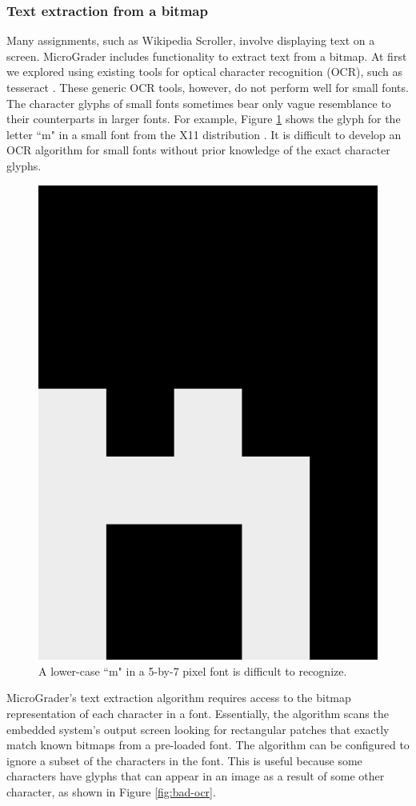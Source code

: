\documentclass[12pt]{article}
\begin{document}
\subsubsection{Text extraction from a bitmap}
Many assignments, such as Wikipedia Scroller, involve displaying text on a screen.  MicroGrader includes functionality to extract text from a bitmap.  At first we explored using existing tools for optical character recognition (OCR), such as tesseract \cite{tesseract}.  These generic OCR tools, however, do not perform well for small fonts.  The character glyphs of small fonts sometimes bear only vague resemblance to their counterparts in larger fonts.  For example, Figure \ref{fig:small-glyph} shows the glyph for the letter ``m" in a small font from the X11 distribution \cite{5x7}.  It is difficult to develop an OCR algorithm for small fonts without prior knowledge of the exact character glyphs.


\begin{figure}[ht]
\centering
\includegraphics[width=0.3\linewidth]{glyph-m.png}
\caption{A lower-case ``m" in a 5-by-7 pixel font is difficult to recognize.}
\label{fig:small-glyph}
\end{figure}

MicroGrader's text extraction algorithm requires access to the bitmap representation of each character in a font.  Essentially, the algorithm scans the embedded system's output screen looking for rectangular patches that exactly match known bitmaps from a pre-loaded font.  The algorithm can be configured to ignore a subset of the characters in the font.  This is useful because some characters have glyphs that can appear in an image as a result of some other character, as shown in Figure \ref{fig:bad-ocr}.
\end{document}
